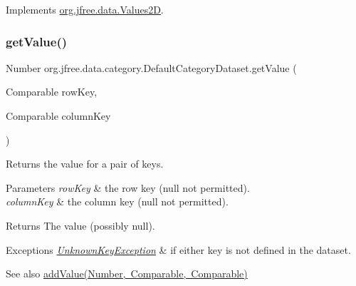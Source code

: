 Implements \mbox{\hyperlink{interfaceorg_1_1jfree_1_1data_1_1_values2_d_a0797937d3ac62e18b300eef1fe906ec6}{org.\+jfree.\+data.\+Values2D}}.

\mbox{\label{classorg_1_1jfree_1_1data_1_1category_1_1_default_category_dataset_a5e7aadea1d0257eaccec5836b66a0d3e}} 
\subsubsection{\texorpdfstring{get\+Value()}{getValue()}\hspace{0.1cm}{\footnotesize\ttfamily [2/2]}}
{\footnotesize\ttfamily Number org.\+jfree.\+data.\+category.\+Default\+Category\+Dataset.\+get\+Value (\begin{DoxyParamCaption}\item[{Comparable}]{row\+Key,  }\item[{Comparable}]{column\+Key }\end{DoxyParamCaption})}

Returns the value for a pair of keys.


\begin{DoxyParams}{Parameters}
{\em row\+Key} & the row key ({\ttfamily null} not permitted). \\
\hline
{\em column\+Key} & the column key ({\ttfamily null} not permitted).\\
\hline
\end{DoxyParams}
\begin{DoxyReturn}{Returns}
The value (possibly {\ttfamily null}).
\end{DoxyReturn}

\begin{DoxyExceptions}{Exceptions}
{\em \mbox{\hyperlink{classorg_1_1jfree_1_1data_1_1_unknown_key_exception}{Unknown\+Key\+Exception}}} & if either key is not defined in the dataset.\\
\hline
\end{DoxyExceptions}
\begin{DoxySeeAlso}{See also}
\mbox{\hyperlink{classorg_1_1jfree_1_1data_1_1category_1_1_default_category_dataset_a69d2a96abc039f088e63b39fcaa4cbe1}{add\+Value(\+Number, Comparable, Comparable)}} 
\end{DoxySeeAlso}


